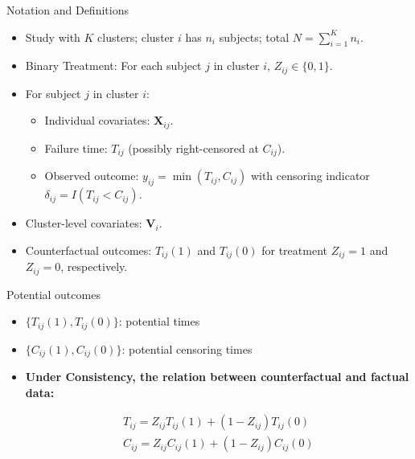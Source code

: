 \begin{frame}{Notation and Definitions}
  \begin{itemize}
    \item Study with \(K\) clusters; cluster \(i\) has \(n_i\) subjects; total \(N=\sum_{i=1}^{K} n_i\).
    \item Binary Treatment: For each subject \(j\) in cluster \(i\), \(Z_{ij}\in\{0,1\}\).
    \item For subject \(j\) in cluster \(i\):
      \begin{itemize}
        \item Individual covariates: \(\mathbf{X}_{ij}\).
        \item Failure time: \(T_{ij}\) (possibly right-censored at \(C_{ij}\)).
        \item Observed outcome: \(y_{ij}=\min(T_{ij}, C_{ij})\) with censoring indicator \(\delta_{ij}=I(T_{ij}<C_{ij})\).
      \end{itemize}
    \item Cluster-level covariates: \(\mathbf{V}_i\).
    \item Counterfactual outcomes: \(T_{ij}(1)\) and \(T_{ij}(0)\) for treatment \(Z_{ij}=1\) and \(Z_{ij}=0\), respectively.
  \end{itemize}
\end{frame}

\begin{frame}{Potential outcomes}
\begin{itemize}
\item $\{T_{ij}(1), T_{ij}(0)\}$: potential times
\item $\{C_{ij}(1), C_{ij}(0)\}$: potential censoring times


\item \textbf{Under Consistency, the relation between counterfactual and factual data:} %

\begin{align*} %
T_{ij} = Z_{ij} T_{ij}(1) + (1 - Z_{ij}) T_{ij}(0) \\
C_{ij} = Z_{ij} C_{ij}(1) + (1 - Z_{ij}) C_{ij}(0)
\end{align*}


\end{itemize} %
\end{frame}


